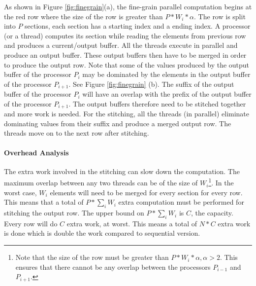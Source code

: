 As shown in Figure \ref{fig:finegrain}(a),  the fine-grain parallel computation begins at the red row where the size of the row is greater than $P*W_{i}*\alpha$.  The  row is split into $P$ sections, each section has a starting index and a ending index.  A processor (or a thread) computes its section while reading the elements from previous row and produces a current/output buffer.  All the threads execute in parallel and produce an output buffer.  These output buffers then have to be merged in order to produce the output row.  Note that some of the values produced by the output buffer of the processor $P_i$ may be dominated by the elements in the output buffer of the processor $P_{i+1}$. See Figure \ref{fig:finegrain} (b).  The suffix of the output buffer of the processor $P_i$ will have an overlap with the prefix of the output buffer of the processor $P_{i+1}$.  The output buffers therefore need to be stitched together and more work is needed.  For the stitching, all the threads (in parallel) eliminate dominating values from their suffix and produce a merged output row.  The threads move on to the next row after stitching.

\paragraph{Overhead Analysis} The extra work involved in the stitching can slow down the computation.  The maximum overlap between any two threads can be of the size of $W_i$\footnote{Note that the size of the row must be greater than $P*W_{i}*\alpha, \alpha>2$.  This ensures that there cannot be any overlap between the processors $P_{i-1}$ and $P_{i+1}$.}.  In the worst case, $W_i$ elements will need to be merged for every section for every row.  This means that a total of $P* \sum_i W_i$ extra computation must be performed for stitching the output row.  The upper bound on $P* \sum_i W_i$ is $C$, the capacity.  Every row will do $C$ extra work, at worst.  This means a total of $N*C$ extra work is done which is double the work compared to sequential version.

